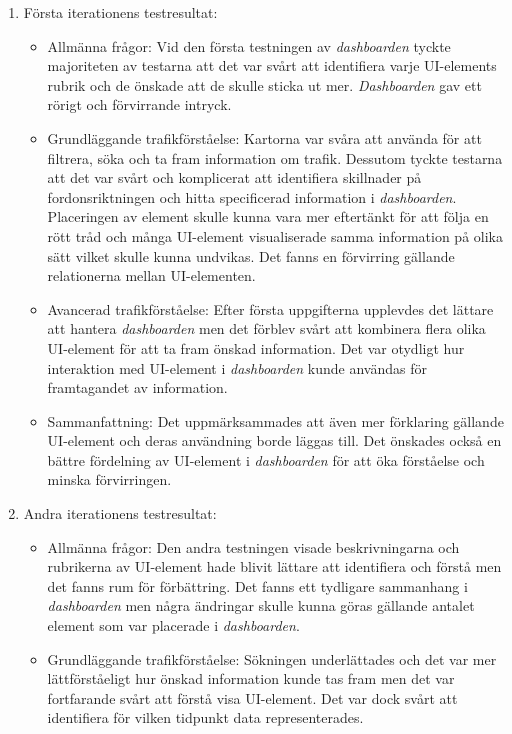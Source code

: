 \documentclass[12pt]{kththesis}
\begin{document}
\begin{enumerate}
\item Första iterationens testresultat:
\begin{itemize}
\item Allmänna frågor: Vid den första testningen av \textit{dashboarden} tyckte majoriteten av testarna att det var svårt att identifiera varje UI-elements rubrik och de önskade att de skulle sticka ut mer. \textit{Dashboarden} gav ett rörigt och förvirrande intryck. 

\item Grundläggande trafikförståelse: Kartorna var svåra att använda för att filtrera, söka och ta fram information om trafik. Dessutom tyckte testarna att det var svårt och komplicerat att identifiera skillnader på fordonsriktningen och hitta specificerad information i \textit{dashboarden}. Placeringen av element skulle kunna vara mer eftertänkt för att följa en rött tråd och många UI-element visualiserade samma information på olika sätt vilket skulle kunna undvikas. Det fanns en förvirring gällande relationerna mellan UI-elementen. 

\item Avancerad trafikförståelse: Efter första uppgifterna upplevdes det lättare att hantera \textit{dashboarden} men det förblev svårt att kombinera flera olika UI-element för att ta fram önskad information. Det var otydligt hur interaktion med UI-element i \textit{dashboarden} kunde användas för framtagandet av information. 

\item Sammanfattning: Det uppmärksammades att även mer förklaring gällande UI-element och deras användning borde läggas till. Det önskades också en bättre fördelning av UI-element i \textit{dashboarden} för att öka förståelse och minska förvirringen.
\end{itemize}

\item    Andra iterationens testresultat:

\begin{itemize}
\item Allmänna frågor: Den andra testningen visade beskrivningarna och rubrikerna av UI-element hade blivit lättare att identifiera och förstå men det fanns rum för förbättring. Det fanns ett tydligare sammanhang i \textit{dashboarden} men några ändringar skulle kunna göras gällande antalet element som var placerade i \textit{dashboarden}.

\item Grundläggande trafikförståelse: Sökningen underlättades och det var mer lättförståeligt hur önskad information kunde tas fram men det var fortfarande svårt att förstå visa UI-element. Det var dock svårt att identifiera för vilken tidpunkt data representerades.


\end{itemize}
\end{enumerate}
\end{document}
